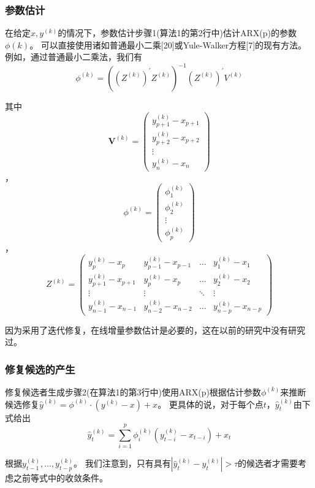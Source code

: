 \documentclass[12pt,a4paper]{article}
\begin{document}
\subsubsection{参数估计}
\par
在给定$x, y^{(k)}$的情况下，参数估计步骤1(算法1的第2行中)估计ARX(p)的参数$\phi(k)$。
可以直接使用诸如普通最小二乘[20]或Yule-Walker方程[7]的现有方法。例如，通过普通最小二乘法，我们有
$$\phi^{(k)}=\left(\left(Z^{(k)}\right)^{\prime} Z^{(k)}\right)^{-1}\left(Z^{(k)}\right)^{\prime} V^{(k)}$$
\par
其中
$$ \boldsymbol{V}^{(k)}=\left( \begin{array}{c}{y_{p+1}^{(k)}-x_{p+1}} \\ {y_{p+2}^{(k)}-x_{p+2}} \\ {\vdots} \\ {y_{n}^{(k)}-x_{n}}\end{array}\right)$$，
    $$\phi^{(k)}=\left( \begin{array}{c}{\phi_{1}^{(k)}} \\ {\phi_{2}^{(k)}} \\ {\vdots} \\ {\phi_{p}^{(k)}}\end{array}\right)$$，
$$
Z^{(k)}=\left( \begin{array}{cccc}{y_{p}^{(k)}-x_{p}} & {y_{p-1}^{(k)}-x_{p-1}} & {\dots} & {y_{1}^{(k)}-x_{1}} \\ {y_{p+1}^{(k)}-x_{p+1}} & {y_{p}^{(k)}-x_{p}} & {\dots} & {y_{2}^{(k)}-x_{2}} \\ {\vdots} & {\vdots} & {\ddots} & {\vdots} \\ {y_{n-1}^{(k)}-x_{n-1}} & {y_{n-2}^{(k)}-x_{n-2}} & {\dots} & {y_{n-p}^{(k)}-x_{n-p}}\end{array}\right)
$$
\par
因为采用了迭代修复，在线增量参数估计是必要的，这在以前的研究中没有研究过。
\subsubsection{修复候选的产生}
修复候选者生成步骤2(在算法1的第3行中)使用ARX(p)根据估计参数$\phi^{(k)}$来推断候选修复$\hat{y}^{(k)}=\phi^{(k)} \cdot\left(y^{(k)}-x\right)+x$。
更具体的说，对于每个点$t$，$\hat{y}_{t}^{(k)}$由下式给出
$$\hat{y}_{t}^{(k)}=\sum_{i=1}^{p} \phi_{i}^{(k)}\left(y_{t-i}^{(k)}-x_{t-i}\right)+x_{t}$$
\par
根据$y_{t-1}^{(k)}, \ldots, y_{t-p}^{(k)}$。
我们注意到，只有具有$\left|\hat{y}_{t}^{(k)}-y_{t}^{(k)}\right|>\tau$的候选者才需要考虑之前等式中的收敛条件。
\end{document}
